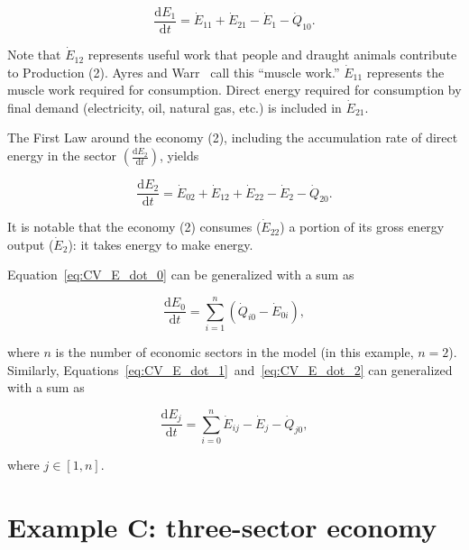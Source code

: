 \begin{equation} \label{eq:CV_E_dot_1}
	\frac{\mathrm{d}E_{1}}{\mathrm{d}t} 	 
	= \dot{E}_{11} 
	+ \dot{E}_{21}
	- \dot{E}_{1}
	- \dot{Q}_{10}.
\end{equation}

Note that $\dot{E}_{12}$ represents useful work that people
and draught animals contribute to Production (2). 
Ayres and Warr~\cite{Ayres:2003ec,Warr:2012cg} call this ``muscle work.'' 
$\dot{E}_{11}$ represents the muscle work required for consumption. 
Direct energy required for consumption 
by final demand (electricity, oil, natural gas, etc.)
is included in $\dot{E}_{21}$.

The First Law around the economy (2), 
including the accumulation rate of direct energy in the sector 
$\left(\frac{\mathrm{d}E_{2}}{\mathrm{d}t}\right)$, yields

\begin{equation} \label{eq:CV_E_dot_2}
	\frac{\mathrm{d}E_{2}}{\mathrm{d}t} 
	= \dot{E}_{02} 
	+ \dot{E}_{12}
	+ \dot{E}_{22} 
	- \dot{E}_{2} 
	- \dot{Q}_{20}.
\end{equation}

\noindent It is notable that the economy (2) consumes ($\dot{E}_{22}$)
a portion of its gross energy output ($\dot{E}_2$): it takes energy to make energy.

Equation~\ref{eq:CV_E_dot_0} can be generalized with a sum as

\begin{equation} \label{eq:CV_E_biosphere_general}
	\frac{\mathrm{d}E_{0}}{\mathrm{d}t} 
	= \sum\limits_{i=1}^n \left( \dot{Q}_{i0} - \dot{E}_{0i} \right),
\end{equation}

\noindent where $n$ is the number of economic sectors in the model
(in this example, $n = 2$).
Similarly, Equations~\ref{eq:CV_E_dot_1}~and~\ref{eq:CV_E_dot_2} 
can generalized with a sum as

\begin{equation} \label{eq:B-CV_E_econ_general}
	\frac{\mathrm{d}E_{j}}{\mathrm{d}t} 
	= \sum\limits_{i=0}^n\dot{E}_{ij} 
	- \dot{E}_{j}  
	- \dot{Q}_{j0},
\end{equation}

\noindent where $j \in [1, n]$.


\section{Example C: three-sector economy}
\label{sec:C_energy}

